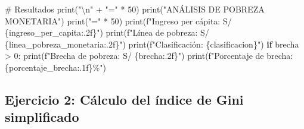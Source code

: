\documentclass[
  doc,
  floatsintext,
  longtable,
  a4paper,
  nolmodern,
  notxfonts,
  notimes,
  12pt,
  colorlinks=true,linkcolor=blue,citecolor=blue,urlcolor=blue]{apa7}
\newenvironment{Shaded}{\begin{snugshade}}{\end{snugshade}}
\newcommand{\BuiltInTok}[1]{\textcolor[rgb]{0.00,0.23,0.31}{#1}}
\newcommand{\CharTok}[1]{\textcolor[rgb]{0.13,0.47,0.30}{#1}}
\newcommand{\CommentTok}[1]{\textcolor[rgb]{0.37,0.37,0.37}{#1}}
\newcommand{\ControlFlowTok}[1]{\textcolor[rgb]{0.00,0.23,0.31}{\textbf{#1}}}
\newcommand{\DecValTok}[1]{\textcolor[rgb]{0.68,0.00,0.00}{#1}}
\newcommand{\NormalTok}[1]{\textcolor[rgb]{0.00,0.23,0.31}{#1}}
\newcommand{\OperatorTok}[1]{\textcolor[rgb]{0.37,0.37,0.37}{#1}}
\newcommand{\SpecialCharTok}[1]{\textcolor[rgb]{0.37,0.37,0.37}{#1}}
\newcommand{\SpecialStringTok}[1]{\textcolor[rgb]{0.13,0.47,0.30}{#1}}
\newcommand{\StringTok}[1]{\textcolor[rgb]{0.13,0.47,0.30}{#1}}
\begin{document}
\begin{Shaded}
\begin{Highlighting}[]
\CommentTok{\# Resultados}
\BuiltInTok{print}\NormalTok{(}\StringTok{"}\CharTok{\textbackslash{}n}\StringTok{"} \OperatorTok{+} \StringTok{"="} \OperatorTok{*} \DecValTok{50}\NormalTok{)}
\BuiltInTok{print}\NormalTok{(}\StringTok{"ANÁLISIS DE POBREZA MONETARIA"}\NormalTok{)}
\BuiltInTok{print}\NormalTok{(}\StringTok{"="} \OperatorTok{*} \DecValTok{50}\NormalTok{)}
\BuiltInTok{print}\NormalTok{(}\SpecialStringTok{f"Ingreso per cápita:       S/ }\SpecialCharTok{\{}\NormalTok{ingreso\_per\_capita}\SpecialCharTok{:.2f\}}\SpecialStringTok{"}\NormalTok{)}
\BuiltInTok{print}\NormalTok{(}\SpecialStringTok{f"Línea de pobreza:         S/ }\SpecialCharTok{\{}\NormalTok{linea\_pobreza\_monetaria}\SpecialCharTok{:.2f\}}\SpecialStringTok{"}\NormalTok{)}
\BuiltInTok{print}\NormalTok{(}\SpecialStringTok{f"Clasificación:            }\SpecialCharTok{\{}\NormalTok{clasificacion}\SpecialCharTok{\}}\SpecialStringTok{"}\NormalTok{)}
\ControlFlowTok{if}\NormalTok{ brecha }\OperatorTok{\textgreater{}} \DecValTok{0}\NormalTok{:}
    \BuiltInTok{print}\NormalTok{(}\SpecialStringTok{f"Brecha de pobreza:        S/ }\SpecialCharTok{\{}\NormalTok{brecha}\SpecialCharTok{:.2f\}}\SpecialStringTok{"}\NormalTok{)}
    \BuiltInTok{print}\NormalTok{(}\SpecialStringTok{f"Porcentaje de brecha:     }\SpecialCharTok{\{}\NormalTok{porcentaje\_brecha}\SpecialCharTok{:.1f\}}\SpecialStringTok{\%"}\NormalTok{)}
\end{Highlighting}
\end{Shaded}

\subsection{Ejercicio 2: Cálculo del índice de Gini
simplificado}\label{ejercicio-2-cuxe1lculo-del-uxedndice-de-gini-simplificado}
\end{document}
